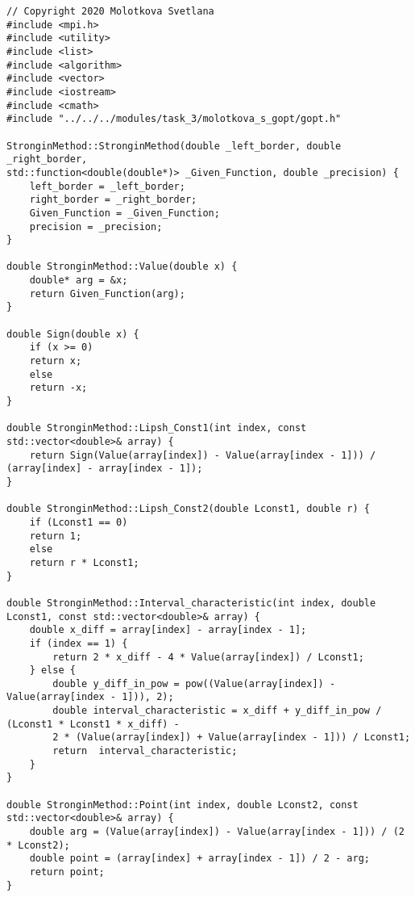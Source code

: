 \documentclass{report}
\begin{document}
\begin{lstlisting}
// Copyright 2020 Molotkova Svetlana
#include <mpi.h>
#include <utility>
#include <list>
#include <algorithm>
#include <vector>
#include <iostream>
#include <cmath>
#include "../../../modules/task_3/molotkova_s_gopt/gopt.h"

StronginMethod::StronginMethod(double _left_border, double _right_border,
std::function<double(double*)> _Given_Function, double _precision) {
	left_border = _left_border;
	right_border = _right_border;
	Given_Function = _Given_Function;
	precision = _precision;
}

double StronginMethod::Value(double x) {
	double* arg = &x;
	return Given_Function(arg);
}

double Sign(double x) {
	if (x >= 0)
	return x;
	else
	return -x;
}

double StronginMethod::Lipsh_Const1(int index, const std::vector<double>& array) {
	return Sign(Value(array[index]) - Value(array[index - 1])) / (array[index] - array[index - 1]);
}

double StronginMethod::Lipsh_Const2(double Lconst1, double r) {
	if (Lconst1 == 0)
	return 1;
	else
	return r * Lconst1;
}

double StronginMethod::Interval_characteristic(int index, double Lconst1, const std::vector<double>& array) {
	double x_diff = array[index] - array[index - 1];
	if (index == 1) {
		return 2 * x_diff - 4 * Value(array[index]) / Lconst1;
	} else {
		double y_diff_in_pow = pow((Value(array[index]) - Value(array[index - 1])), 2);
		double interval_characteristic = x_diff + y_diff_in_pow / (Lconst1 * Lconst1 * x_diff) -
		2 * (Value(array[index]) + Value(array[index - 1])) / Lconst1;
		return  interval_characteristic;
	}
}

double StronginMethod::Point(int index, double Lconst2, const std::vector<double>& array) {
	double arg = (Value(array[index]) - Value(array[index - 1])) / (2 * Lconst2);
	double point = (array[index] + array[index - 1]) / 2 - arg;
	return point;
}


\end{lstlisting}
\end{document}

